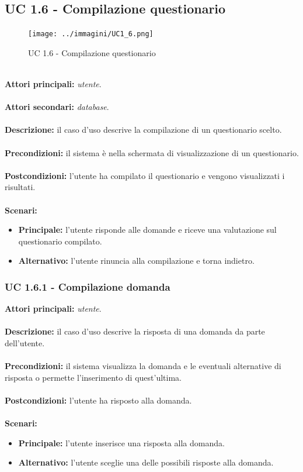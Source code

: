 \documentclass[a4paper,11pt]{article}
\begin{document}
\newpage

\subsection{UC 1.6 - Compilazione questionario}

\begin{figure}[h!]
\centering
\texttt{[image: ../immagini/UC1\_6.png]}
\caption{UC 1.6 - Compilazione questionario}
\end{figure}
\ \\
\textbf{Attori principali:} \textit{utente}.\\
\ \\
\textbf{Attori secondari:} \textit{database}.\\
\\
\textbf{Descrizione:} il caso d'uso descrive la compilazione di un questionario scelto. \\
\\
\textbf{Precondizioni:} il sistema è nella schermata di visualizzazione di un questionario.\\
\\
\textbf{Postcondizioni:} l'utente ha compilato il questionario e vengono visualizzati i risultati. \\
\\
\textbf{Scenari:}
\begin{itemize}
\item \textbf{Principale:} l'utente risponde alle domande e riceve una valutazione sul questionario compilato.
\item \textbf{Alternativo:} l'utente rinuncia alla compilazione e torna indietro.\\ 
\end{itemize}
\vspace{6 mm}
\subsubsection{UC 1.6.1 - Compilazione domanda}

\textbf{Attori principali:} \textit{utente}.\\
\\
\textbf{Descrizione:} il caso d'uso descrive la risposta di una domanda da parte dell'utente. \\
\\
\textbf{Precondizioni:} il sistema visualizza la domanda e le eventuali alternative di risposta o permette l'inserimento di quest'ultima.\\
\\
\textbf{Postcondizioni:} l'utente ha risposto alla domanda. \\
\\
\textbf{Scenari:}
\begin{itemize}
\item \textbf{Principale:} l'utente inserisce una risposta alla domanda.
\item \textbf{Alternativo:} l'utente sceglie una delle possibili risposte alla domanda.\\ 
\end{itemize}
\vspace{6 mm}
\end{document}

